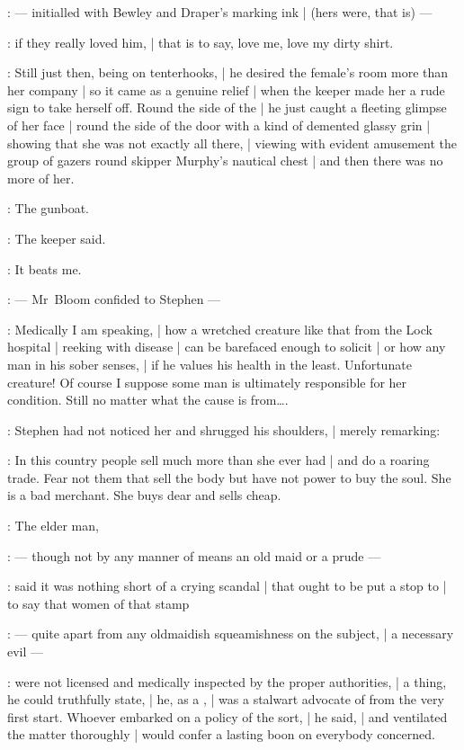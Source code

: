 :
    --- initialled with Bewley and Draper's marking ink |
        (hers were, that is) ---

:
if they really loved him, |
that is to say, love me, love my dirty shirt.

:
Still just then, being on tenterhooks, |
he desired the female's room more than her company |
so it came as a genuine relief |
when the keeper made her a rude sign to take herself off.
Round the side of the  |
he just caught a fleeting glimpse of her face |
round the side of the door with a kind of demented glassy grin |
showing that she was not exactly all there, |
viewing with evident amusement
the group of gazers round skipper Murphy's nautical chest |
and then there was no more of her.

\SkinTheGoat:
The gunboat.

:
The keeper said.

\Bloom:
It beats me.

:
    --- Mr~Bloom confided to Stephen ---

\Bloom:
Medically I am speaking, |
how a wretched creature like that from the Lock hospital |
reeking with disease |
can be barefaced enough to solicit |
or how any man in his sober senses, |
if he values his health in the least.
Unfortunate creature!
Of course I suppose some man is ultimately responsible for her condition.
Still no matter what the cause is from\ldots.

:
Stephen had not noticed her and shrugged his shoulders, |
merely remarking:

\Stephen:
In this country people sell much more than she ever had |
and do a roaring trade.
Fear not them that sell the body but have not power to buy the soul.
She is a bad merchant.
She buys dear and sells cheap.

:
The elder man,

:
    --- though not by any manner of means an old maid or a prude ---

:
said it was nothing short of a crying scandal |
that ought to be put a stop to  |
to say that women of that stamp

:
    --- quite apart from any oldmaidish squeamishness on the subject, |
        a necessary evil ---

:
were not licensed and medically inspected by the proper authorities, |
a thing, he could truthfully state, |
he, as a , |
was a stalwart advocate of from the very first start.
Whoever embarked on a policy of the sort, |
he said, |
and ventilated the matter thoroughly |
would confer a lasting boon on everybody concerned.

